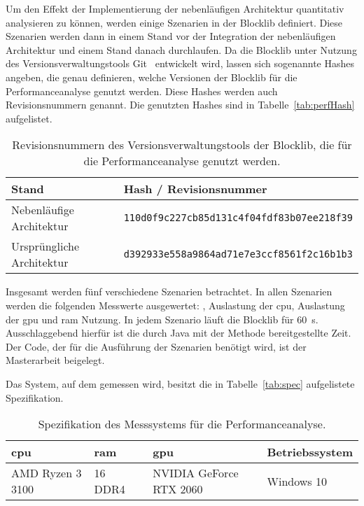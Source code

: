 Um den Effekt der Implementierung der nebenläufigen Architektur quantitativ analysieren zu können, werden einige Szenarien in der Blocklib definiert. Diese Szenarien werden dann in einem Stand vor der Integration der nebenläufigen Architektur und einem Stand danach durchlaufen. Da die Blocklib unter Nutzung des Versionsverwaltungstools Git~\cite{Chacon2014} entwickelt wird, lassen sich sogenannte Hashes angeben, die genau definieren, welche Versionen der Blocklib für die Performanceanalyse genutzt werden. Diese Hashes werden auch Revisionsnummern genannt. Die genutzten Hashes sind in Tabelle~\vref{tab:perfHash} aufgelistet.
\begin{table}[!htbp]
	\centering
	\begin{tabular}{ll}
		\toprule
		Stand & Hash / Revisionsnummer \\
		\midrule
		Nebenläufige Architektur & \texttt{110d0f9c227cb85d131c4f04fdf83b07ee218f39}\\
		Ursprüngliche Architektur & \texttt{d392933e558a9864ad71e7e3ccf8561f2c16b1b3} \\
		\bottomrule
	\end{tabular}
	\caption{Revisionsnummern des Versionsverwaltungstools der Blocklib, die für die Performanceanalyse genutzt werden.}\label{tab:perfHash}
\end{table}

Insgesamt werden fünf verschiedene Szenarien betrachtet. In allen Szenarien werden die folgenden Messwerte ausgewertet: \si{\fps}, Auslastung der \acs{cpu}, Auslastung der \ac{gpu} und \ac{ram} Nutzung. In jedem Szenario läuft die Blocklib für \SI{60}{\second}. Ausschlaggebend hierfür ist die durch Java mit der Methode  bereitgestellte Zeit. Der Code, der für die Ausführung der Szenarien benötigt wird, ist der Masterarbeit beigelegt.

Das System, auf dem gemessen wird, besitzt die in Tabelle~\vref{tab:spec} aufgelistete Spezifikation.

\begin{table}[!h]
	\centering
	\begin{tabular}[]{llll}
		\ac{cpu} & \ac{ram} & \ac{gpu} & Betriebssystem\\
		\midrule
		AMD Ryzen 3 3100 & \SI{16}{\giga\byte} DDR4 & NVIDIA GeForce RTX 2060 & Windows 10
	\end{tabular}
	\caption{Spezifikation des Messsystems für die Performanceanalyse.}\label{tab:spec}
\end{table}

